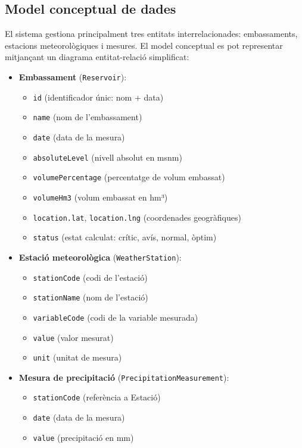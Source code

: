 
\subsection{Model conceptual de dades}

El sistema gestiona principalment tres entitats interrelacionades: embassaments, estacions meteorològiques i mesures. El model conceptual es pot representar mitjançant un diagrama entitat-relació simplificat:

\begin{itemize}
    \item \textbf{Embassament} (\texttt{Reservoir}):
    \begin{itemize}
        \item \texttt{id} (identificador únic: nom + data)
        \item \texttt{name} (nom de l'embassament)
        \item \texttt{date} (data de la mesura)
        \item \texttt{absoluteLevel} (nivell absolut en msnm)
        \item \texttt{volumePercentage} (percentatge de volum embassat)
        \item \texttt{volumeHm3} (volum embassat en hm³)
        \item \texttt{location.lat}, \texttt{location.lng} (coordenades geogràfiques)
        \item \texttt{status} (estat calculat: crític, avís, normal, òptim)
    \end{itemize}
    
    \item \textbf{Estació meteorològica} (\texttt{WeatherStation}):
    \begin{itemize}
        \item \texttt{stationCode} (codi de l'estació)
        \item \texttt{stationName} (nom de l'estació)
        \item \texttt{variableCode} (codi de la variable mesurada)
        \item \texttt{value} (valor mesurat)
        \item \texttt{unit} (unitat de mesura)
    \end{itemize}
    
    \item \textbf{Mesura de precipitació} (\texttt{PrecipitationMeasurement}):
    \begin{itemize}
        \item \texttt{stationCode} (referència a Estació)
        \item \texttt{date} (data de la mesura)
        \item \texttt{value} (precipitació en mm)
    \end{itemize}
    

\end{itemize}
